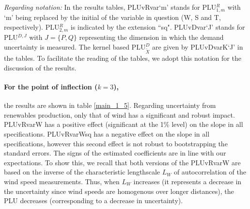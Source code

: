 
\emph{Regarding notation:  } In the results tables,
 PLUvRvar`m' stands for PLU$^R_{1,m}$ with `m' being replaced by the initial of the variable in question (W, S and T, respectively). PLU$^R_{2,m}$ is indicated by the extension ``sq".  PLUvDvar`J' stands for PLU$^{D,J}$ with $J=\{P,Q\}$ representing the dimension in which the demand uncertainty is measured.
 The kernel based PLU$^D_{\tilde{X}}$ are given by PLUvDvarK`J' in the tables.
To facilitate the reading of the tables, we adopt this notation for the discussion of the results. 


\paragraph{For the point of inflection ($k=3$),}
the results are shown in table \ref{main_1_5}. %
Regarding uncertainty from renewables production, only that of wind has a significant and robust impact. PLUvRvarW has a positive effect (significant at the 1\% level) on the slope in all specifications. PLUvRvarWsq has a negative effect on the slope in all specifications, however this second effect is not robust to bootstrapping the standard errors. The signs of the estimated coefficients are in line with our expectations. To show this, we recall that both versions of the PLUvRvarW are %
based on the inverse of the characteristic lengthscale $L_W$ of autocorrelation of the wind speed measurements. Thus,  when $L_W$ increases (it represents a decrease in the uncertainty since wind speeds are homogenous over longer distances), the PLU decreases (corresponding to a decrease in uncertainty). \\

